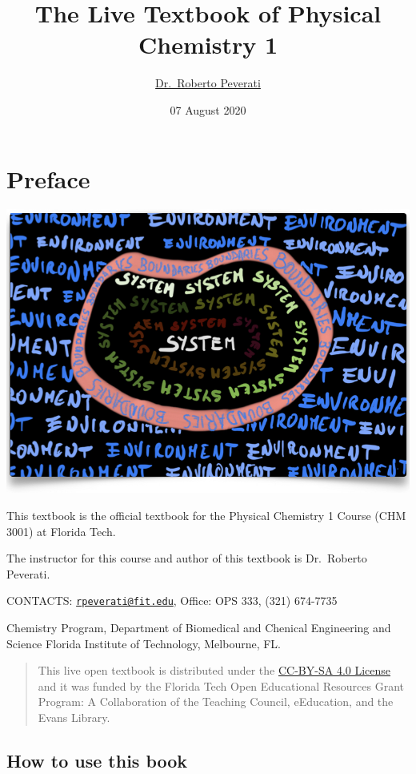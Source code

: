 \documentclass[
]{book}
\title{The Live Textbook of Physical Chemistry 1}
\author{\href{mailto:rpeverati@fit.edu}{Dr.~Roberto Peverati}}
\date{07 August 2020}
\theoremstyle{definition}
\theoremstyle{definition}
\theoremstyle{definition}
\theoremstyle{remark}
\begin{document}
\maketitle

{
\setcounter{tocdepth}{1}
\tableofcontents
}
\hypertarget{preface}{%
\chapter*{Preface}\label{preface}}

\begin{center}\includegraphics[width=0.8\linewidth]{./img/OEP_Figures.000} \end{center}

This textbook is the official textbook for the Physical Chemistry 1 Course (CHM 3001) at Florida Tech.

The instructor for this course and author of this textbook is Dr.~Roberto Peverati.

CONTACTS: \href{mailto:rpeverati@fit.edu}{\nolinkurl{rpeverati@fit.edu}}, Office: OPS 333, (321) 674-7735

Chemistry Program, Department of Biomedical and Chenical Engineering and Science
Florida Institute of Technology, Melbourne, FL.

\begin{quote}
This live open textbook is distributed under the \href{https://creativecommons.org/licenses/by-sa/4.0/}{CC-BY-SA 4.0 License} and it was funded by the Florida Tech Open Educational Resources Grant Program: A Collaboration of the Teaching Council, eEducation, and the Evans Library.
\end{quote}

\hypertarget{how-to-use-this-book}{%
\section*{How to use this book}\label{how-to-use-this-book}}
\end{document}
